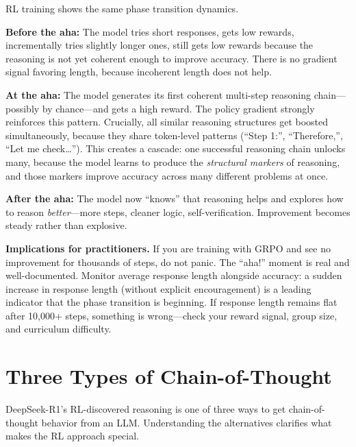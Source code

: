\begin{chapterenv}
\begin{infobox}
RL training shows the same phase transition dynamics.

\textbf{Before the aha:} The model tries short responses, gets low rewards, incrementally tries slightly longer ones, still gets low rewards because the reasoning is not yet coherent enough to improve accuracy. There is no gradient signal favoring length, because incoherent length does not help.

\textbf{At the aha:} The model generates its first coherent multi-step reasoning chain---possibly by chance---and gets a high reward. The policy gradient strongly reinforces this pattern. Crucially, all similar reasoning structures get boosted simultaneously, because they share token-level patterns (``Step 1:'', ``Therefore,'', ``Let me check\ldots''). This creates a cascade: one successful reasoning chain unlocks many, because the model learns to produce the \textit{structural markers} of reasoning, and those markers improve accuracy across many different problems at once.

\textbf{After the aha:} The model now ``knows'' that reasoning helps and explores how to reason \textit{better}---more steps, cleaner logic, self-verification. Improvement becomes steady rather than explosive.
\end{infobox}

\begin{tipbox}
\textbf{Implications for practitioners.} If you are training with GRPO and see no improvement for thousands of steps, do not panic. The ``aha!'' moment is real and well-documented. Monitor average response length alongside accuracy: a sudden increase in response length (without explicit encouragement) is a leading indicator that the phase transition is beginning. If response length remains flat after 10,000+ steps, something is wrong---check your reward signal, group size, and curriculum difficulty.
\end{tipbox}

\section{Three Types of Chain-of-Thought}

DeepSeek-R1's RL-discovered reasoning is one of three ways to get chain-of-thought behavior from an LLM. Understanding the alternatives clarifies what makes the RL approach special.


\end{chapterenv}
